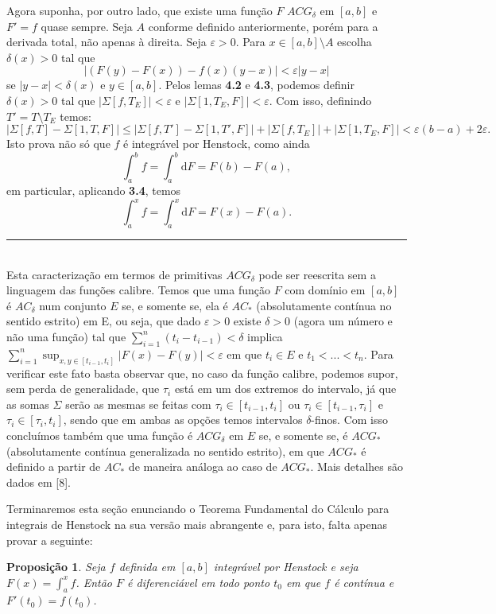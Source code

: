 \documentclass[12pt, a4paper]{article}
\newtheorem{prop}[mydef]{Proposição}
\def\eop{\hfill\rule{2.5mm}{2.5mm}}
\theoremstyle{definition}
\begin{document}
Agora suponha, por outro lado, que existe uma função $F$ $ACG_\delta$ em $[a,b]$ e $F'=f$ quase sempre. Seja $A$ conforme definido anteriormente, porém para a derivada total, não apenas à direita. Seja $\varepsilon > 0$. Para $x\in [a,b]\setminus A$ escolha $\delta(x)>0$ tal que $$|(F(y)-F(x))-f(x)(y-x)|<\varepsilon |y-x|$$ se $|y-x|<\delta(x)$ e $y\in [a,b]$. Pelos lemas \textbf{4.2} e \textbf{4.3}, podemos definir $\delta(x)>0$ tal que $| \Sigma[f,T_E]|<\varepsilon$ e $| \Sigma[1,T_E,F]|<\varepsilon$. Com isso, definindo $T'=T\setminus T_E$ temos: $$|\Sigma[f,T]-\Sigma[1,T,F]|\leq |\Sigma[f,T']-\Sigma[1,T',F]|+|\Sigma[f,T_E]|+|\Sigma[1,T_E,F]|<\varepsilon (b-a)+2\varepsilon .$$ Isto prova não só que $f$ é integrável por Henstock, como ainda $$\int_a^b f=\int_a^b  \text{d}F= F(b)-F(a),$$ em particular, aplicando \textbf{3.4}, temos $$\int_a^x f=\int_a^x  \text{d}F=F(x)-F(a).$$ \eop \\

Esta caracterização em termos de primitivas $ACG_\delta$ pode ser reescrita sem a linguagem das funções calibre. Temos que uma função $F$ com domínio em $[a,b]$ é $AC_\delta$ num conjunto $E$ se, e somente se, ela é $AC_*$ (absolutamente contínua no sentido estrito) em E, ou seja, que dado $\varepsilon >0$ existe $\delta > 0$ (agora um número e não uma função) tal que $\sum_{i=1}^n (t_i-t_{i-1}) < \delta$ implica $\sum_{i=1}^n \sup_{x,y \in [t_{i-1},t_i]} |F(x)-F(y)|< \varepsilon$ em que $t_i\in E$ e $t_1<...<t_n$.  Para verificar este fato basta observar que, no caso da função calibre, podemos supor, sem perda de generalidade, que $\tau_i$ está em um dos extremos do intervalo, já que as somas $\Sigma$ serão as mesmas se feitas com $\tau_i\in [t_{i-1},t_i]$ ou $\tau_i\in [t_{i-1},\tau_i]$ e $\tau_i\in [\tau_i,t_i]$, sendo que em ambas as opções temos intervalos $\delta$-finos. Com isso concluímos também que uma função é $ACG_\delta$ em $E$ se, e somente se, é $ACG_*$ (absolutamente contínua generalizada no sentido estrito), em que $ACG_*$ é definido a partir de $AC_*$ de maneira análoga ao caso de $ACG_*$. Mais detalhes são dados em [8].

Terminaremos esta seção enunciando o Teorema Fundamental do Cálculo para integrais de Henstock na sua versão mais abrangente e, para isto, falta apenas provar a seguinte: 

\begin{prop}
	
	Seja $f$ definida em $[a,b]$ integrável por Henstock e seja $F(x)=\int_a^x f$. Então $F$ é diferenciável em todo ponto $t_0$ em que $f$ é contínua e $F'(t_0)=f(t_0)$.
	
\end{prop}    
\end{document}
